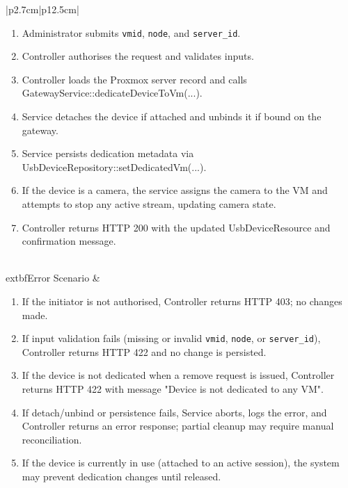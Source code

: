 \begin{table}[H]
\begin{tabular}{|p{2.7cm}|p{12.5cm}|}
\begin{minipage}[t]{\linewidth}
\begin{enumerate}[topsep=0pt,itemsep=1pt,parsep=0pt,partopsep=0pt]
                                          \item Administrator submits \texttt{vmid}, \texttt{node}, and \texttt{server\_id}.
                                          \item Controller authorises the request and validates inputs.
                                          \item Controller loads the Proxmox server record and calls GatewayService::dedicateDeviceToVm(...).
                                          \item Service detaches the device if attached and unbinds it if bound on the gateway.
                                          \item Service persists dedication metadata via UsbDeviceRepository::setDedicatedVm(...).
                                          \item If the device is a camera, the service assigns the camera to the VM and attempts to stop any active stream, updating camera state.
                                          \item Controller returns HTTP 200 with the updated UsbDeviceResource and confirmation message.
                                      \end{enumerate}
                                  \end{minipage} \\ \hline
        	extbf{Error Scenario} & \begin{minipage}[t]{\linewidth}
                                      \begin{enumerate}[topsep=0pt,itemsep=1pt,parsep=0pt,partopsep=0pt]
                                          \item If the initiator is not authorised, Controller returns HTTP 403; no changes made.
                                          \item If input validation fails (missing or invalid \texttt{vmid}, \texttt{node}, or \texttt{server\_id}), Controller returns HTTP 422 and no change is persisted.
                                          \item If the device is not dedicated when a remove request is issued, Controller returns HTTP 422 with message "Device is not dedicated to any VM".
                                          \item If detach/unbind or persistence fails, Service aborts, logs the error, and Controller returns an error response; partial cleanup may require manual reconciliation.
                                          \item If the device is currently in use (attached to an active session), the system may prevent dedication changes until released.
                                      \end{enumerate}
                                  \end{minipage} \\ \hline
    \end{tabular}
    \label{tab:admin-dedicate-remove-device}
\end{table}
